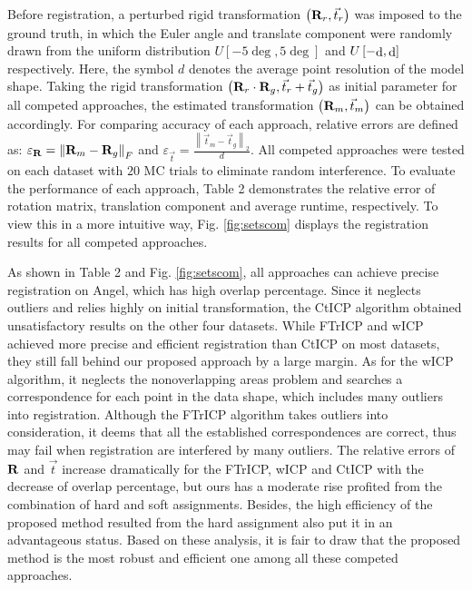 \documentclass[review]{elsarticle}
\begin{document}
Before registration, a perturbed rigid transformation $\left( {{{\bf{R}}_r},{{\vec t }_r}} \right)$ was imposed to the ground truth, in which the Euler angle and translate component were randomly drawn from the uniform distribution $U\left[ { - 5\deg ,5\deg } \right]$ and $U\left[ { - {\mathop{\rm d}\nolimits} ,{\mathop{\rm d}\nolimits} } \right]$ respectively. Here, the symbol $d$ denotes the average point resolution of the model shape. Taking the rigid transformation $\left( {{{\bf{R}}_r} \cdot {{\bf{R}}_g},{{\vec t }_r} + {{\vec t }_g}} \right)$ as initial parameter for all competed approaches, the estimated transformation $\left( {{{\bf{R}}_m},{{\vec t }_m}} \right)$ can be obtained accordingly. For comparing accuracy of each approach, relative errors are defined as: ${\varepsilon _{\bf{R}}} = {\left\| {{{\bf{R}}_m} - {{\bf{R}}_g}} \right\|_F}$ and ${\varepsilon _{\vec t }} = \frac{{{{\left\| {{{\vec t }_m} - {{\vec t }_g}} \right\|}_2}}}{d}$. All competed approaches were tested on each dataset with $20$ MC trials to eliminate random interference. To evaluate the performance of each approach, Table 2 demonstrates the relative error of rotation matrix, translation component and average runtime, respectively. To view this in a more intuitive way, Fig. \ref{fig:setscom} displays the registration results for all competed approaches.

As shown in Table 2 and Fig. \ref{fig:setscom}, all approaches can achieve precise registration on Angel, which has high overlap percentage.  Since it neglects outliers and relies highly on initial transformation, the CtICP algorithm obtained unsatisfactory results on the other four datasets. While FTrICP and wICP achieved more precise and efficient registration than CtICP on most datasets, they still fall behind our proposed approach by a large margin. As for the wICP algorithm, it neglects the nonoverlapping areas problem and searches a correspondence for each point in the data shape, which includes many outliers into registration. Although the FTrICP algorithm takes outliers into consideration, it deems that all the established correspondences are correct, thus may fail when registration are interfered by many outliers. The relative errors of ${\bf{R}}$ and ${\vec t }$ increase dramatically for the FTrICP, wICP and CtICP with the decrease of overlap percentage, but ours has a moderate rise profited from the combination of hard and soft assignments. Besides, the high efficiency of the proposed method resulted from the hard assignment also put it in an advantageous status. Based on these analysis, it is fair to draw that the proposed method is the most robust and efficient one among all these competed approaches.
\end{document}

